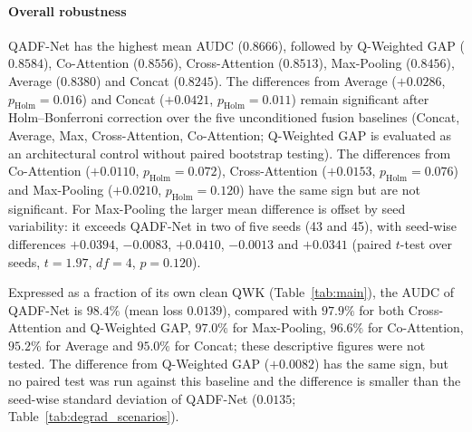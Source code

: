 \documentclass[final,5p,times,twocolumn,authoryear]{elsarticle}
\newcommand{\qadfnet}{QADF-Net}
\theoremstyle{plain}
\theoremstyle{remark}
\begin{document}
\paragraph{Overall robustness} \qadfnet{} has the highest mean AUDC ($0.8666$), followed by Q-Weighted GAP ($0.8584$), Co-Attention ($0.8556$), Cross-Attention ($0.8513$), Max-Pooling ($0.8456$), Average ($0.8380$) and Concat ($0.8245$). The differences from Average ($+0.0286$, $p_{\text{Holm}}=0.016$) and Concat ($+0.0421$, $p_{\text{Holm}}=0.011$) remain significant after Holm--Bonferroni correction over the five unconditioned fusion baselines (Concat, Average, Max, Cross-Attention, Co-Attention; Q-Weighted GAP is evaluated as an architectural control without paired bootstrap testing). The differences from Co-Attention ($+0.0110$, $p_{\text{Holm}}=0.072$), Cross-Attention ($+0.0153$, $p_{\text{Holm}}=0.076$) and Max-Pooling ($+0.0210$, $p_{\text{Holm}}=0.120$) have the same sign but are not significant. For Max-Pooling the larger mean difference is offset by seed variability: it exceeds \qadfnet{} in two of five seeds (43 and 45), with seed-wise differences $+0.0394$, $-0.0083$, $+0.0410$, $-0.0013$ and $+0.0341$ (paired $t$-test over seeds, $t=1.97$, $df=4$, $p=0.120$).

Expressed as a fraction of its own clean QWK (Table~\ref{tab:main}), the AUDC of \qadfnet{} is $98.4\%$ (mean loss $0.0139$), compared with $97.9\%$ for both Cross-Attention and Q-Weighted GAP, $97.0\%$ for Max-Pooling, $96.6\%$ for Co-Attention, $95.2\%$ for Average and $95.0\%$ for Concat; these descriptive figures were not tested. The difference from Q-Weighted GAP ($+0.0082$) has the same sign, but no paired test was run against this baseline and the difference is smaller than the seed-wise standard deviation of \qadfnet{} ($0.0135$; Table~\ref{tab:degrad_scenarios}).
\end{document}
